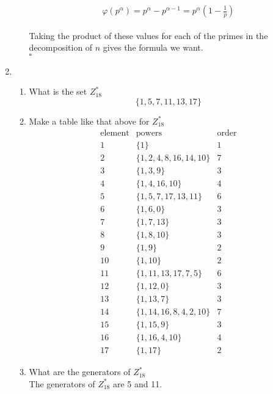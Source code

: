\documentclass[12pt]{amsart}
\newcommand{\benu}{\begin{enumerate}}
\newcommand{\eenu}{\end{enumerate}}
\theoremstyle{definition}
\begin{document}
\begin{enumerate}
\begin{enumerate}
$$ \varphi(p^{\alpha}) = p^{\alpha} - p^{\alpha - 1} = p^{\alpha}(1 - \tfrac{1}{p})$$
\\
Taking the product of these values for each of the primes in the decomposition of $n$ gives the formula we want.
\\
$\square$
\end{enumerate}

\newpage %

\item
\benu
\item What is the set $Z_{18}^*$
\\
$$\{1,5,7,11,13,17\}$$
\item Make a table like that above for $Z_{18}^*$
\begin{equation*}
\begin{array}{c|c|c}
\text{element} & \text{powers} & \text{order}

\\
\hline
1 & \{1\} & 1
\\
\hline
2 & \{1, 2, 4, 8, 16, 14, 10\} & 7
\\
\hline
3 & \{1, 3, 9\} & 3
\\
\hline
4 & \{1, 4, 16, 10\} & 4
\\
\hline
5 & \{1, 5, 7, 17, 13, 11\} & 6
\\
\hline
6 & \{1, 6, 0\} & 3
\\
\hline
7 & \{1, 7, 13\} & 3
\\
\hline
8 & \{1, 8, 10\} & 3
\\
\hline
9 & \{1, 9\} & 2
\\
\hline
10 & \{1, 10\} & 2
\\
\hline
11 & \{1, 11, 13, 17, 7, 5\} & 6
\\
\hline
12 & \{1, 12, 0\} & 3
\\
\hline
13 & \{1, 13, 7\} & 3
\\
\hline
14 & \{1, 14, 16, 8, 4, 2, 10\} & 7
\\
\hline
15 & \{1, 15, 9\} & 3
\\
\hline
16 & \{1, 16, 4, 10\} & 4
\\
\hline
17 & \{1, 17\} & 2

\end{array}
\end{equation*}

\item What are the generators of $Z_{18}^*$
\\
The generators of $Z_{18}^*$ are 5 and 11.
\eenu

\newpage %


\end{enumerate}
\end{document}
